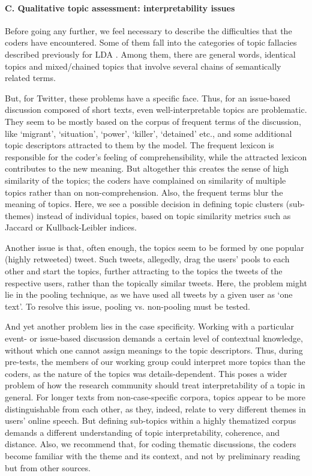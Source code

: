 \paragraph{C. Qualitative topic assessment: interpretability issues}
Before going any further, we feel necessary to describe the difficulties that the coders have encountered. Some of them fall into the categories of topic fallacies described previously for LDA \cite{BoydGraberMimnoNewman}. Among them, there are general words, identical topics and mixed/chained topics that involve several chains of semantically related terms.

But, for Twitter, these problems have a specific face. Thus, for an issue-based discussion composed of short texts, even well-interpretable topics are problematic. They seem to be mostly based on the corpus of frequent terms of the discussion, like ‘migrant’, ‘situation’, ‘power’, ‘killer’, ‘detained’ etc., and some additional topic descriptors attracted to them by the model. The frequent lexicon is responsible for the coder’s feeling of comprehensibility, while the attracted lexicon contributes to the new meaning. But altogether this creates the sense of high similarity of the topics; the coders have complained on similarity of multiple topics rather than on non-comprehension. Also, the frequent terms blur the meaning of topics. Here, we see a possible decision in defining topic clusters (sub-themes) instead of individual topics, based on topic similarity metrics such as Jaccard or Kullback-Leibler indices.

Another issue is that, often enough, the topics seem to be formed by one popular (highly retweeted) tweet. Such tweets, allegedly, drag the users’ pools to each other and start the topics, further attracting to the topics the tweets of the respective users, rather than the topically similar tweets. Here, the problem might lie in the pooling technique, as we have used all tweets by a given user as ‘one text’. To resolve this issue, pooling vs. non-pooling must be tested.

And yet another problem lies in the case specificity. Working with a particular event- or issue-based discussion demands a certain level of contextual knowledge, without which one cannot assign meanings to the topic descriptors. Thus, during pre-tests, the members of our working group could interpret more topics than the coders, as the nature of the topics was details-dependent. This poses a wider problem of how the research community should treat interpretability of a topic in general. For longer texts from non-case-specific corpora, topics appear to be more distinguishable from each other, as they, indeed, relate to very different themes in users’ online speech. But defining sub-topics within a highly thematized corpus demands a different understanding of topic interpretability, coherence, and distance. Also, we recommend that, for coding thematic discussions, the coders become familiar with the theme and its context, and not by preliminary reading but from other sources.

